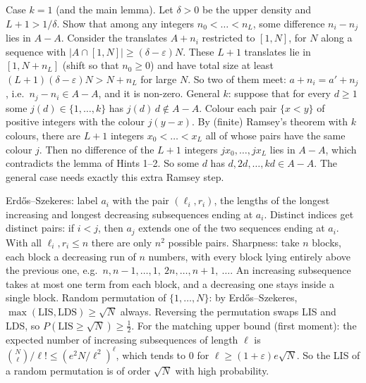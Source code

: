 \documentclass[11pt,a4paper]{article}
\begin{document}
 Case $k=1$ (and the main lemma). Let $\delta>0$ be the upper density and $L+1>1/\delta$. Show that among any integers $n_0<\dots<n_L$, some difference $n_i-n_j$ lies in $A-A$. Consider the translates $A+n_i$ restricted to $[1,N]$, for $N$ along a sequence with $|A\cap[1,N]|\ge(\delta-\varepsilon)N$.
 These $L+1$ translates lie in $[1,N+n_L]$ (shift so that $n_0\geq 0$) and have total size at least $(L+1)(\delta-\varepsilon)N>N+n_L$ for large $N$. So two of them meet: $a+n_i=a'+n_j$, i.e.\ $n_j-n_i\in A-A$, and it is non-zero.
 General $k$: suppose that for every $d\ge1$ some $j(d)\in\{1,\dots,k\}$ has $j(d)\,d\notin A-A$. Colour each pair $\{x<y\}$ of positive integers with the colour $j(y-x)$. By (finite) Ramsey's theorem with $k$ colours, there are $L+1$ integers $x_0<\dots<x_L$ all of whose pairs have the same colour $j$.
 Then no difference of the $L+1$ integers $jx_0,\dots,jx_L$ lies in $A-A$, which contradicts the lemma of Hints 1--2. So some $d$ has $d,2d,\dots,kd\in A-A$. The general case needs exactly this extra Ramsey step.

 Erd\H{o}s--Szekeres: label $a_i$ with the pair $(\ell_i,r_i)$, the lengths of the longest increasing and longest decreasing subsequences ending at $a_i$. Distinct indices get distinct pairs: if $i<j$, then $a_j$ extends one of the two sequences ending at $a_i$. With all $\ell_i,r_i\le n$ there are only $n^2$ possible pairs.
 Sharpness: take $n$ blocks, each block a decreasing run of $n$ numbers, with every block lying entirely above the previous one, e.g.\ $n,n-1,\dots,1,\ 2n,\dots,n+1,\ \dots$. An increasing subsequence takes at most one term from each block, and a decreasing one stays inside a single block.
 Random permutation of $\{1,\dots,N\}$: by Erd\H{o}s--Szekeres, $\max(\mathrm{LIS},\mathrm{LDS})\ge\sqrt N$ always. Reversing the permutation swaps LIS and LDS, so $P(\mathrm{LIS}\ge\sqrt N)\ge\tfrac12$.
 For the matching upper bound (first moment): the expected number of increasing subsequences of length $\ell$ is $\binom N\ell/\ell!\le(e^2N/\ell^2)^\ell$, which tends to $0$ for $\ell\ge(1+\varepsilon)e\sqrt N$. So the LIS of a random permutation is of order $\sqrt N$ with high probability.
\end{document}

